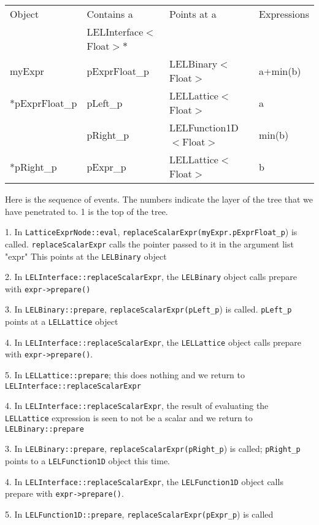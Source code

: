 \begin{center}
\begin{tabular}{|l|l|l|l}
\hline
Object & Contains a & Points at a & Expressions \\
       & LELInterface$<$Float$>*$ & &    \\
\hline
myExpr  &         pExprFloat\_p   &  LELBinary$<$Float$>$ &     a+min(b) \\
*pExprFloat\_p  &  pLeft\_p   &  LELLattice$<$Float$>$ &   a \\
               &  pRight\_p  &  LELFunction1D$<$Float$>$ &   min(b) \\
*pRight\_p      &  pExpr\_p   &  LELLattice$<$Float$>$  &  b \\
\hline
\end{tabular}
\end{center}



Here is the sequence of events.  The numbers indicate the layer
of the tree that we have penetrated to.  1 is the top of the tree.

1. In {\tt LatticeExprNode::eval}, {\tt replaceScalarExpr(myExpr.pExprFloat\_p}) is called.  
{\tt replaceScalarExpr} calls the pointer passed to it in the argument list "expr"  
This  points at the {\tt LELBinary} object
   
2. In {\tt LELInterface::replaceScalarExpr}, the {\tt LELBinary} object calls prepare 
with {\tt expr->prepare()} 

3. In {\tt LELBinary::prepare},  {\tt replaceScalarExpr(pLeft\_p}) is called.   
{\tt pLeft\_p} points at a {\tt LELLattice} object

4. In {\tt LELInterface::replaceScalarExpr}, the {\tt LELLattice} object calls 
prepare with {\tt expr->prepare()}.

5. In {\tt LELLattice::prepare}; this does nothing and we 
return to {\tt LELInterface::replaceScalarExpr}

4. In {\tt LELInterface::replaceScalarExpr}, the result of evaluating the 
{\tt LELLattice} expression is seen to not be a scalar and we 
return  to {\tt LELBinary::prepare}

3. In {\tt LELBinary::prepare}, {\tt replaceScalarExpr(pRight\_p}) is called; 
{\tt pRight\_p} points to a {\tt LELFunction1D} object this time.

4. In {\tt LELInterface::replaceScalarExpr}, the {\tt LELFunction1D} object calls 
prepare with {\tt expr->prepare()}.

5. In {\tt LELFunction1D::prepare}, {\tt replaceScalarExpr(pExpr\_p}) is called 

